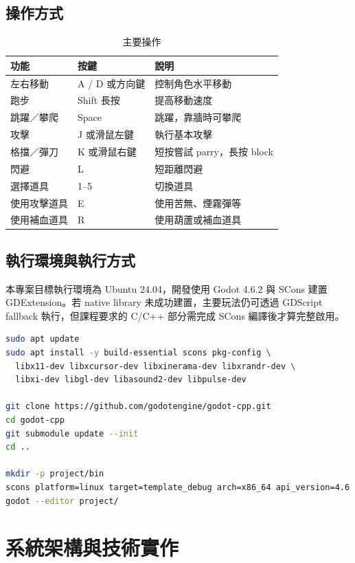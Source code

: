 \documentclass[12pt,a4paper]{article}
\begin{document}
\subsection{操作方式}
\begin{table}[H]
\centering
\caption{主要操作}
\begin{tabular}{lll}
\toprule
功能 & 按鍵 & 說明 \\
\midrule
左右移動 & A / D 或方向鍵 & 控制角色水平移動 \\
跑步 & Shift 長按 & 提高移動速度 \\
跳躍／攀爬 & Space & 跳躍，靠牆時可攀爬 \\
攻擊 & J 或滑鼠左鍵 & 執行基本攻擊 \\
格擋／彈刀 & K 或滑鼠右鍵 & 短按嘗試 parry，長按 block \\
閃避 & L & 短距離閃避 \\
選擇道具 & 1--5 & 切換道具 \\
使用攻擊道具 & E & 使用苦無、煙霧彈等 \\
使用補血道具 & R & 使用葫蘆或補血道具 \\
\bottomrule
\end{tabular}
\end{table}

\subsection{執行環境與執行方式}
本專案目標執行環境為 Ubuntu 24.04，開發使用 Godot 4.6.2 與 SCons 建置 GDExtension。若 native library 未成功建置，主要玩法仍可透過 GDScript fallback 執行，但課程要求的 C/C++ 部分需完成 SCons 編譯後才算完整啟用。

\begin{lstlisting}[language=bash,caption={Ubuntu 24.04 建置與執行指令}]
sudo apt update
sudo apt install -y build-essential scons pkg-config \
  libx11-dev libxcursor-dev libxinerama-dev libxrandr-dev \
  libxi-dev libgl-dev libasound2-dev libpulse-dev

git clone https://github.com/godotengine/godot-cpp.git
cd godot-cpp
git submodule update --init
cd ..

mkdir -p project/bin
scons platform=linux target=template_debug arch=x86_64 api_version=4.6
godot --editor project/
\end{lstlisting}

\section{系統架構與技術實作}
\end{document}
